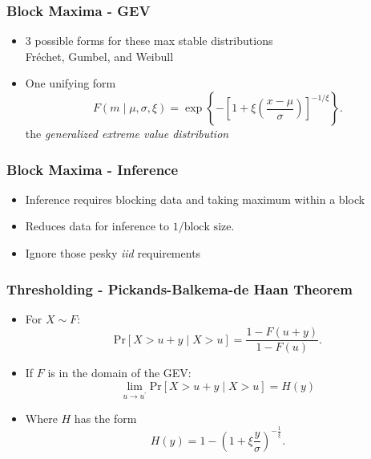 \documentclass[aspectratio=169]{beamer}
\begin{document}
\begin{frame}
  \frametitle{Block Maxima - GEV}
  \begin{itemize}
    \item 3 possible forms for these max stable distributions\\
      \hspace{1cm}Fr{\'e}chet, Gumbel, and Weibull
    \pause
    \item One unifying form
      \begin{equation*}
        F(m \mid \mu, \sigma, \xi) = \exp\left\lbrace-\left[1 +
              \xi\left(\frac{x - \mu}{\sigma}\right)\right]_{}^{-1/{\xi}}\right\rbrace.
      \end{equation*}
      the \emph{generalized extreme value distribution}
  \end{itemize}
\end{frame}

\begin{frame}
  \frametitle{Block Maxima - Inference}
  \begin{itemize}
    \item Inference requires blocking data and taking maximum within a block
    \item Reduces data for inference to $1 / \text{block size}$.
    \item Ignore those pesky \emph{iid} requirements
  \end{itemize}
\end{frame}

\begin{frame}
  \frametitle{Thresholding - Pickands-Balkema-de Haan Theorem}
  \begin{itemize}
    \item For $X \sim F$:
      \begin{equation*}
        \text{Pr}\left[X > u + y\mid X > u\right] = \frac{1 - F(u + y)}{1 - F(u)}.
      \end{equation*}
    \pause
    \item If $F$ is in the domain of the GEV:
      \begin{equation*}
        \lim\limits_{u\to u^{\prime}}\text{Pr}\left[X > u + y\mid X > u\right] = H(y)
      \end{equation*}
    \pause
    \item Where $H$ has the form
      \begin{equation*}
        H(y) = 1 - \left(1 + \xi\frac{y}{\sigma}\right)^{-\frac{1}{\xi}}.
      \end{equation*}
  \end{itemize}
\end{frame}
\end{document}
